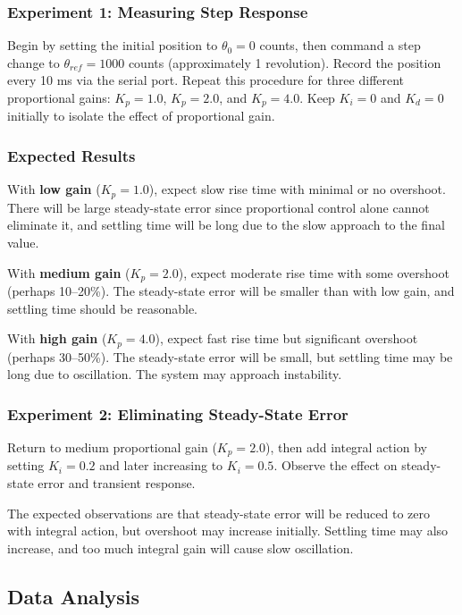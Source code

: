 \subsubsection{Experiment 1: Measuring Step Response}

Begin by setting the initial position to $\theta_0 = 0$ counts, then command a step change to $\theta_{ref} = 1000$ counts (approximately 1 revolution). Record the position every 10 ms via the serial port. Repeat this procedure for three different proportional gains: $K_p = 1.0$, $K_p = 2.0$, and $K_p = 4.0$. Keep $K_i = 0$ and $K_d = 0$ initially to isolate the effect of proportional gain.

\subsubsection{Expected Results}

With \textbf{low gain} ($K_p = 1.0$), expect slow rise time with minimal or no overshoot. There will be large steady-state error since proportional control alone cannot eliminate it, and settling time will be long due to the slow approach to the final value.

With \textbf{medium gain} ($K_p = 2.0$), expect moderate rise time with some overshoot (perhaps 10--20\%). The steady-state error will be smaller than with low gain, and settling time should be reasonable.

With \textbf{high gain} ($K_p = 4.0$), expect fast rise time but significant overshoot (perhaps 30--50\%). The steady-state error will be small, but settling time may be long due to oscillation. The system may approach instability.

\subsubsection{Experiment 2: Eliminating Steady-State Error}

Return to medium proportional gain ($K_p = 2.0$), then add integral action by setting $K_i = 0.2$ and later increasing to $K_i = 0.5$. Observe the effect on steady-state error and transient response.

The expected observations are that steady-state error will be reduced to zero with integral action, but overshoot may increase initially. Settling time may also increase, and too much integral gain will cause slow oscillation.

\subsection{Data Analysis}

